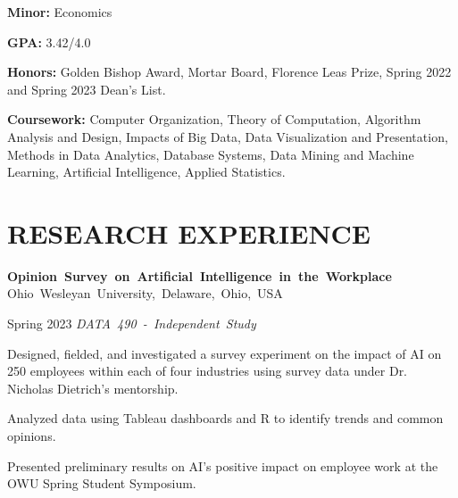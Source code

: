 \documentclass[10pt, letterpaper]{article}
\begin{document}
\vspace{\highlightSpacing}
\begin{onecolentry}
    \begin{highlights}
        \item \textbf{Minor:} Economics
        \item \textbf{GPA:} 3.42/4.0
        \item \textbf{Honors:} Golden Bishop Award, Mortar Board, Florence Leas Prize, Spring 2022 and Spring 2023 Dean's List.

        \item \textbf{Coursework:} Computer Organization, Theory of Computation, Algorithm Analysis and Design, Impacts of Big Data, Data Visualization and Presentation, Methods in Data Analytics, Database Systems, Data Mining and Machine Learning, Artificial Intelligence, Applied Statistics.
    \end{highlights}
\end{onecolentry}

\section{RESEARCH EXPERIENCE}

\mbox{\textbf{Opinion Survey on Artificial Intelligence in the Workplace}}
\kern {}
\AND
\kern {}
\mbox{Ohio Wesleyan University, Delaware, Ohio, USA}

\vspace{\highlightSpacing}
\begin{twocolentry}{Spring 2023}
    \mbox{\textit{DATA 490 - Independent Study}}
\end{twocolentry}

\vspace{\highlightSpacing}
\begin{onecolentry}
    \begin{highlights}
        \item Designed, fielded, and investigated a survey experiment on the impact of AI on 250 employees within each of four industries using survey data under Dr. Nicholas Dietrich's mentorship.
        \item Analyzed data using Tableau dashboards and R to identify trends and common opinions.
        \item Presented preliminary results on AI's positive impact on employee work at the OWU Spring Student Symposium.
    \end{highlights}
\end{onecolentry}
\end{document}
